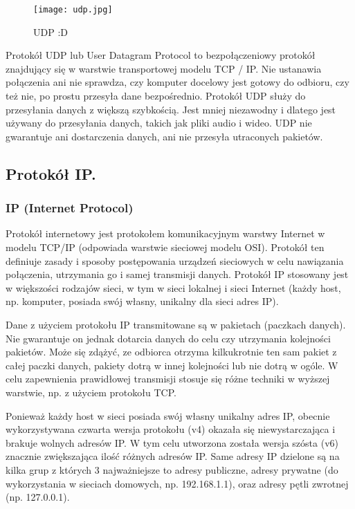 \documentclass[a4paper,12pt,oneside]{book}
\begin{document}
				\begin{figure}[h!]
					\centering\texttt{[image: udp.jpg]}
					\caption{UDP :D}
				\end{figure}
				
				Protokół UDP lub User Datagram Protocol to bezpołączeniowy protokół znajdujący się w warstwie transportowej modelu TCP / IP. Nie ustanawia połączenia ani nie sprawdza, czy komputer docelowy jest gotowy do odbioru, czy też nie, po prostu przesyła dane bezpośrednio. Protokół UDP służy do przesyłania danych z większą szybkością. Jest mniej niezawodny i dlatego jest używany do przesyłania danych, takich jak pliki audio i wideo.
				UDP nie gwarantuje ani dostarczenia danych, ani nie przesyła utraconych pakietów.	
				
							
			
			\newpage\subsection{Protokół IP.}
				\subsubsection{IP (Internet Protocol)}
				Protokół internetowy jest protokołem komunikacyjnym warstwy Internet w modelu TCP/IP (odpowiada warstwie sieciowej modelu OSI). Protokół ten definiuje zasady i sposoby postępowania urządzeń sieciowych w celu nawiązania połączenia, utrzymania go i samej transmisji danych. Protokół IP stosowany jest w większości rodzajów sieci, w tym w sieci lokalnej i sieci Internet (każdy host, np. komputer, posiada swój własny, unikalny dla sieci adres IP).
				
				Dane z użyciem protokołu IP transmitowane są w pakietach (paczkach danych). Nie gwarantuje on jednak dotarcia danych do celu czy utrzymania kolejności pakietów. Może się zdążyć, ze odbiorca otrzyma kilkukrotnie ten sam pakiet z całej paczki danych, pakiety dotrą w innej kolejności lub nie dotrą w ogóle. W celu zapewnienia prawidłowej transmisji stosuje się różne techniki w wyższej warstwie, np. z użyciem protokołu TCP.
				
				Ponieważ każdy host w sieci posiada swój własny unikalny adres IP, obecnie wykorzystywana czwarta wersja protokołu (v4) okazała się niewystarczająca i brakuje wolnych adresów IP. W tym celu utworzona została wersja szósta (v6) znacznie zwiększająca ilość różnych adresów IP. Same adresy IP dzielone są na kilka grup z których 3 najważniejsze to adresy publiczne, adresy prywatne (do wykorzystania w sieciach domowych, np. 192.168.1.1), oraz adresy pętli zwrotnej (np. 127.0.0.1).
				
\end{document}
